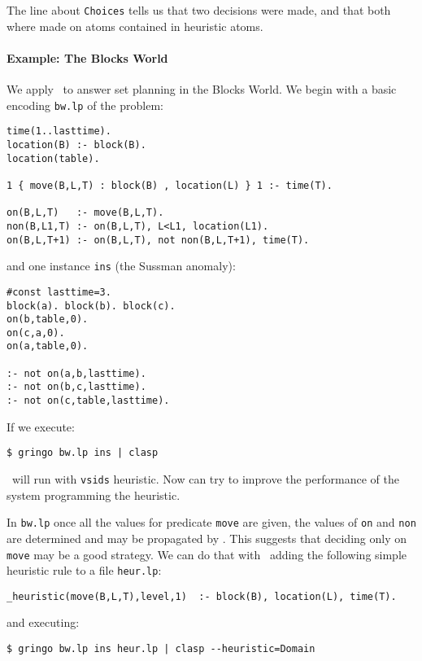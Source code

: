  The line about \texttt{Choices} tells us that  two decisions were made, and that both where made on atoms contained in heuristic atoms.


\paragraph{Example: The Blocks World}

 We apply \clasp\ to answer set planning in the Blocks World.  We begin with a basic encoding \texttt{bw.lp} of the problem:
\begin{verbatim}
time(1..lasttime).
location(B) :- block(B).
location(table).

1 { move(B,L,T) : block(B) , location(L) } 1 :- time(T).

on(B,L,T)   :- move(B,L,T).
non(B,L1,T) :- on(B,L,T), L<L1, location(L1).
on(B,L,T+1) :- on(B,L,T), not non(B,L,T+1), time(T). \end{verbatim}

 and one instance \texttt{ins} (the Sussman anomaly):
\begin{verbatim}
#const lasttime=3.
block(a). block(b). block(c).
on(b,table,0).
on(c,a,0).
on(a,table,0).

:- not on(a,b,lasttime).
:- not on(b,c,lasttime).
:- not on(c,table,lasttime).
\end{verbatim}

If we execute:
\begin{verbatim}
$ gringo bw.lp ins | clasp \end{verbatim}

\clasp\ will run with \texttt{vsids} heuristic. Now can try to improve the performance of the system programming the heuristic.

 In \texttt{bw.lp} once all the values for predicate \texttt{move} are given,
 the values of \texttt{on} and \texttt{non} are determined and may be propagated by \clasp.
 This suggests that deciding only on \texttt{move} may be a good strategy.
 We can do that with \clasp\ adding the following simple heuristic rule to a file \texttt{heur.lp}:

\begin{verbatim}
_heuristic(move(B,L,T),level,1)  :- block(B), location(L), time(T).\end{verbatim}

and executing:
\begin{verbatim}
$ gringo bw.lp ins heur.lp | clasp --heuristic=Domain \end{verbatim}

